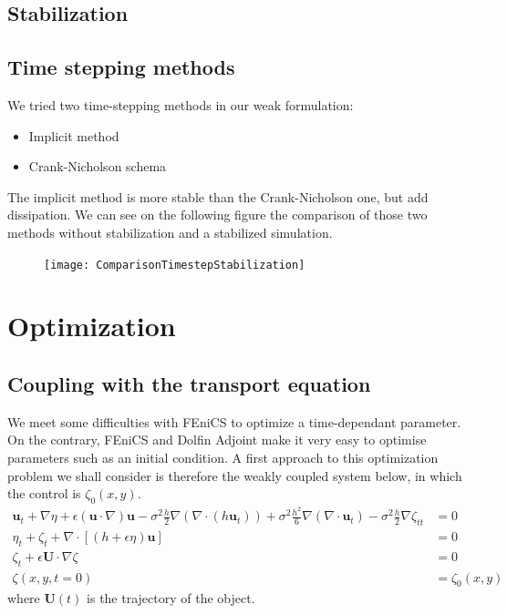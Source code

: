 \documentclass[11pt,a4paper]{article}
\begin{document}
		\subsection{Stabilization}
			\pagebreak
		\subsection{Time stepping methods}
			We tried two time-stepping methods in our weak formulation:
			\begin{itemize}
				\item Implicit method
				\item Crank-Nicholson schema
			\end{itemize}
			The implicit method is more stable than the Crank-Nicholson one, but add dissipation. We can see on the following figure the comparison of those two methods without stabilization and a stabilized simulation.
			\begin{figure}[!h]
				 \texttt{[image: ComparisonTimestepStabilization]}
			\end{figure}
			
			\pagebreak				
	\section{Optimization}		
		\subsection{Coupling with the transport equation}
			We meet some difficulties with FEniCS to optimize a time-dependant parameter. On the contrary, FEniCS and Dolfin Adjoint make it very easy to optimise parameters	such as an initial condition. A first approach to this optimization problem we shall consider is therefore the weakly coupled system below, in which the control is $\zeta_0(x,y)$.
		\begin{align}
			\mathbf{u}_t + \nabla \eta + \epsilon (\mathbf{u} \cdot \nabla)\mathbf{u} - \sigma^2\frac{h}{2}\nabla (\nabla \cdot (h \mathbf{u}_t)) + \sigma^2 \frac{h^2}{6}\nabla (\nabla \cdot \mathbf{u}_t) - \sigma^2\frac{h}{2}\nabla \zeta_{tt}  &= 0\\
			\eta_t+\zeta_t + \nabla \cdot [(h+\epsilon\eta)\mathbf{u}] &= 0 \\
			\zeta_t + \epsilon \mathbf{U} \cdot \nabla \zeta &= 0\\
			\zeta(x,y,t=0) &= \zeta_0(x,y)
		\end{align}
		where $\mathbf{U}(t)$ is the trajectory of the object.
				
\end{document}
